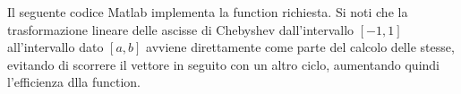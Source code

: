 \begin{center}
\footnotesize\noindent{}\end{center}

\noindent Il seguente codice Matlab implementa la function richiesta. Si noti che la trasformazione lineare delle ascisse di Chebyshev dall'intervallo \([-1, 1]\) all'intervallo dato \([a, b]\) avviene direttamente come parte del calcolo delle stesse, evitando di scorrere il vettore in seguito con un altro ciclo, aumentando quindi l'efficienza dlla function.


